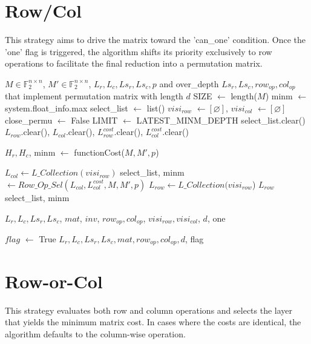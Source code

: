 \section{Row/Col}
This strategy aims to drive the matrix toward the 'can\_one' condition. Once the 'one' flag is triggered, the algorithm shifts its priority exclusively to row operations to facilitate the final reduction into a permutation matrix.
\begin{algorithm}
\caption{Row/Col Greedy}
\begin{algorithmic}[1]
\Require $M \in \mathbb{F}_{2}^{n \times n}$, $M' \in \mathbb{F}_{2}^{n \times n}$, $L_{r}, L_{c}, Ls_{r}, Ls_{c}, p$ and over\_depth
\Ensure $Ls_{r}, Ls_{c}, row_{op}, col_{op}$ that implement permutation matrix with length $d$
\State SIZE $\leftarrow$ length($M$)
\State minm $\leftarrow$ system.float\_info.max
\State select\_list $\leftarrow$ list()
\State $visi_{row}$ $\leftarrow [\varnothing]$, $visi_{col}$ $\leftarrow [\varnothing]$
\State close\_permu $\leftarrow$ False
\State LIMIT $\leftarrow$ LATEST\_MINM\_DEPTH
	\State select\_list.clear()
	\State $L_{row}$.clear(), $L_{col}$.clear(), $L_{row}^{cost}$.clear(), $L_{col}^{cost}$.clear()
	
	\State $H_{r}, H_{c}$, minm $\leftarrow$ functionCost($M, M', p$)
    
		\State $L_{col} \leftarrow L\_Collection(visi_{row})$
	    \State select\_list, minm $\leftarrow Row\_Op\_Sel( L_{col}, L_{col}^{cost}, M, M', p)$ 
    \EndIf
	\State $L_{row} \leftarrow L\_Collection(visi_{row}$)
    \State \Return $L_{row}$
	\EndFunction
    \State \Return select\_list, minm
	\EndFunction
    
    \State \Return $L_{r}, L_{c}, Ls_{r}, Ls_{c}$, $mat$, $inv$, $row_{op}, col_{op}$, $visi_{row}, visi_{col}$, $d$, one
	\EndFunction
    
	    \State $flag$ $\leftarrow$ True
	    \State \Return
    \EndIf
\EndWhile
\State \Return $L_{r}, L_{c}, Ls_{r}, Ls_{c}, mat, row_{op}, col_{op}, d$, flag
\end{algorithmic}
\end{algorithm}

\section{Row-or-Col}
This strategy evaluates both row and column operations and selects the layer that yields the minimum matrix cost. In cases where the costs are identical, the algorithm defaults to the column-wise operation. 

